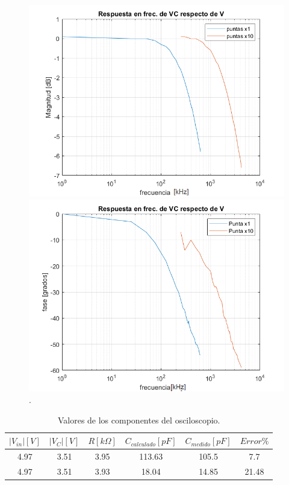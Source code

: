 \begin{figure}[H]
\centering
\begin{minipage}{.5\textwidth}
\includegraphics[scale=0.45]{1-8a.png}
\end{minipage}%
\begin{minipage}{.5\textwidth}
\includegraphics[scale=0.45]{1-8b.png}
\end{minipage}
\caption{.}
\label{fig:puntas}
\end{figure}



\begin{table}[!htb]
\centering
\begin{tabular}{|c|c|c|c|c|c|}
\hline 
$|V_{in}|[V]$ & $|V_{C}|[V]$ & $R[k\Omega]$ & $C_{calculado}[pF]$ & $C_{medido}[pF]$ & $Error\%$\\
\hline 
\hline 
4.97 & 3.51 & 3.95 & 113.63 & 105.5 & 7.7\\
\hline 
4.97 & 3.51 & 3.93 & 18.04 & 14.85 & 21.48\\
\hline 
\end{tabular}
\caption{Valores de los componentes del osciloscopio.}
\label{tab:tablaOsc}
\end{table}


